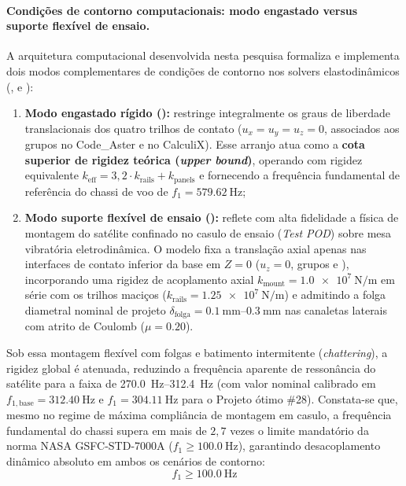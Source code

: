 \paragraph{Condições de contorno computacionais: modo engastado versus suporte flexível de ensaio.}
A arquitetura computacional desenvolvida nesta pesquisa formaliza e implementa dois modos complementares de condições de contorno nos solvers elastodinâmicos (,  e ):
\begin{enumerate}
  \item \textbf{Modo engastado rígido ():} restringe integralmente os graus de liberdade translacionais dos quatro trilhos de contato ($u_x = u_y = u_z = 0$, associados aos grupos  no Code\_Aster e  no CalculiX). Esse arranjo atua como a \textbf{cota superior de rigidez teórica (\textit{upper bound})}, operando com rigidez equivalente $k_{\text{eff}} = 3{,}2 \cdot k_{\text{rails}} + k_{\text{panels}}$ e fornecendo a frequência fundamental de referência do chassi de voo de $f_1 = \SI{579.62}{\hertz}$;
  \item \textbf{Modo suporte flexível de ensaio ():} reflete com alta fidelidade a física de montagem do satélite confinado no casulo de ensaio (\textit{Test POD}) sobre mesa vibratória eletrodinâmica. O modelo fixa a translação axial apenas nas interfaces de contato inferior da base em $Z = 0$ ($u_z = 0$, grupos  e ), incorporando uma rigidez de acoplamento axial $k_{\text{mount}} = \SI{1.0e7}{\newton\per\metre}$ em série com os trilhos maciços ($k_{\text{rails}} = \SI{1.25e7}{\newton\per\metre}$) e admitindo a folga diametral nominal de projeto $\delta_{\text{folga}} = \SIrange{0.1}{0.3}{\milli\metre}$ nas canaletas laterais com atrito de Coulomb ($\mu = \num{0.20}$).
\end{enumerate}

Sob essa montagem flexível com folgas e batimento intermitente (\textit{chattering}), a rigidez global é atenuada, reduzindo a frequência aparente de ressonância do satélite para a faixa de \SIrange{270.0}{312.4}{\hertz} (com valor nominal calibrado em $f_{1,\text{base}} = \SI{312.40}{\hertz}$ e $f_1 = \SI{304.11}{\hertz}$ para o Projeto ótimo \#28). Constata-se que, mesmo no regime de máxima compliância de montagem em casulo, a frequência fundamental do chassi supera em mais de $2{,}7$ vezes o limite mandatório da norma NASA GSFC-STD-7000A ($f_1 \ge \SI{100.0}{\hertz}$), garantindo desacoplamento dinâmico absoluto em ambos os cenários de contorno:
\begin{equation}
  f_1 \ge \SI{100.0}{\hertz}
  \label{eq:f1min}
\end{equation}

